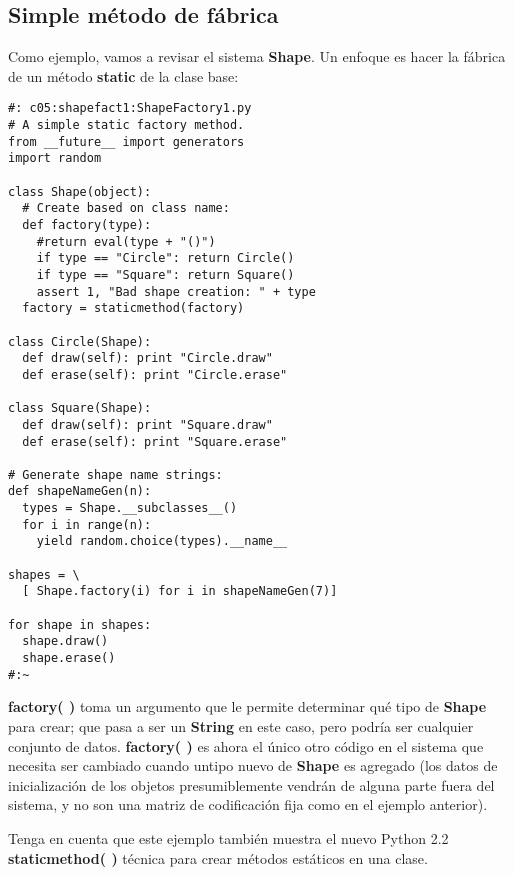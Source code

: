 \subsection*{Simple método de fábrica}
\label{subsec:felcdo}

Como ejemplo, vamos a revisar el sistema \textbf{Shape}. 
Un enfoque es hacer la fábrica de un método \textbf{static} de la clase base:   \newline

\begin{lstlisting} 
#: c05:shapefact1:ShapeFactory1.py 
# A simple static factory method. 
from __future__ import generators 
import random 

class Shape(object): 
  # Create based on class name: 
  def factory(type): 
    #return eval(type + "()") 
    if type == "Circle": return Circle() 
    if type == "Square": return Square() 
    assert 1, "Bad shape creation: " + type 
  factory = staticmethod(factory) 
  
class Circle(Shape): 
  def draw(self): print "Circle.draw"  
  def erase(self): print "Circle.erase"  
  
class Square(Shape): 
  def draw(self): print "Square.draw"  
  def erase(self): print "Square.erase"  
  
# Generate shape name strings: 
def shapeNameGen(n): 
  types = Shape.__subclasses__() 
  for i in range(n): 
    yield random.choice(types).__name__ 
    
shapes = \ 
  [ Shape.factory(i) for i in shapeNameGen(7)] 
  
for shape in shapes: 
  shape.draw() 
  shape.erase() 
#:~   
\end{lstlisting}

\textbf{factory( )} toma un argumento que le permite determinar qué tipo de \textbf{Shape} para crear; que pasa a ser un \textbf{String} en este caso, pero podría ser cualquier conjunto de datos.  \textbf{factory( )} es ahora el único otro código en el sistema que necesita ser cambiado cuando untipo nuevo de \textbf{Shape} es agregado (los datos de inicialización de los objetos presumiblemente vendrán de alguna parte fuera del sistema, y no son una matriz de codificación fija como en el ejemplo anterior).    \newline

Tenga en cuenta que este ejemplo también muestra el nuevo Python 2.2 \textbf{staticmethod( )} técnica para crear métodos estáticos en una clase.     \newline

